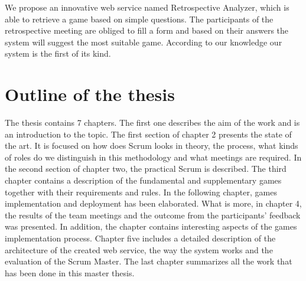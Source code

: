 We propose an innovative web service named Retrospective Analyzer, which is able to retrieve a game based on simple questions. The participants of the retrospective meeting are obliged to fill a form and based on their answers the system will suggest the most suitable game. According to our knowledge our system is the first of its kind.

\section{Outline of the thesis}

The thesis contains 7 chapters. The first one describes the aim of the work and is an introduction to the topic. The first section of chapter 2 presents the state of the art. It is focused on how does Scrum looks in theory, the process, what kinds of roles do we distinguish in this methodology and what meetings are required. In the second section of chapter two, the practical Scrum is described. The third chapter contains a description of the fundamental and supplementary games together with their requirements and rules. In the following chapter, games implementation and deployment has been elaborated. What is more, in chapter 4, the results of the team meetings and the outcome from the participants' feedback was presented. In addition, the chapter contains interesting aspects of the games implementation process. Chapter five includes a detailed description of the architecture of the created web service, the way the system works and the evaluation of the Scrum Master. The last chapter summarizes all the work that has been done in this master thesis.
